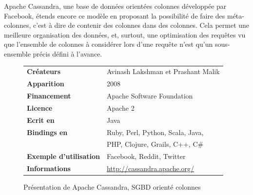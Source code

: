 \documentclass[11pt]{article}
\begin{document}
Apache Cassandra, une base de données orientées colonnes développée par Facebook, étends encore ce modèle en proposant la possibilité de faire des méta-colonnes, c'est à dire de contenir des colonnes dans des colonnes. Cela permet une meilleure organisation des données, et, surtout, une optimisation des requêtes vu que l'ensemble de colonnes à considérer lors d'une requête n'est qu'un sous-ensemble précis défini à l'avance.
\begin{figure}[H]
  \centering
  \begin{tabular}{l | l}
    \textbf{Créateurs} & Avinash Lakshman et Prashant Malik \\
    \textbf{Apparition} & 2008 \\
    \textbf{Financement} & Apache Software Foundation \\
    \textbf{Licence} & Apache 2 \\
    \textbf{Ecrit en} & Java \\
    \textbf{Bindings en} & Ruby, Perl, Python, Scala, Java, \\
    &   PHP, Clojure, Grails, C++, C\#\\
    \textbf{Exemple d'utilisation} & Facebook, Reddit, Twitter \\
    \textbf{Informations} & \url{http://cassandra.apache.org/}
  \end{tabular}
  \caption{Présentation de Apache Cassandra, SGBD orienté colonnes}
\end{figure} 
\end{document}
